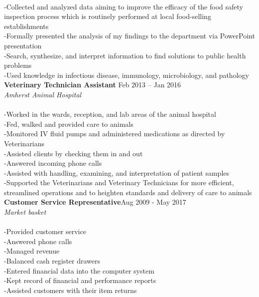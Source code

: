 \documentclass[11pt]{article}
\begin{document}
{{        \\-Collected and analyzed data aiming to improve the efficacy of the food safety inspection process which is routinely performed at local food-selling establishments 
        \\-Formally presented the analysis of my findings to the department via PowerPoint presentation
        \\-Search, synthesize, and interpret information to find solutions to public health problems
        \\-Used knowledge in infectious disease, immunology, microbiology, and pathology\\
        } \vspace{14pt}		
		\textsf{\textbf{Veterinary Technician Assistant }\hspace{245pt}Feb 2013 – Jan 2016 \\ \textit{Amherst Animal Hospital}\\
		 \\-Worked in the wards, reception, and lab areas of the animal hospital
        \\-Fed, walked and provided care to animals
        \\-Monitored IV fluid pumps and administered medications as directed by Veterinarians
        \\-Assisted clients by checking them in and out
        \\-Answered incoming phone calls
        \\-Assisted with handling, examining, and interpretation of patient samples
        \\-Supported the Veterinarians and Veterinary Technicians for more efficient, streamlined operations and to heighten standards and delivery of care to animals\\
        } \vspace{10pt}			
		\textsf{\textbf{Customer Service Representative}\hspace{240pt}Aug 2009 - May 2017 \\ \textit{Market basket}\\
		\\-Provided customer service
        \\-Answered phone calls 
        \\-Managed revenue
        \\-Balanced cash register drawers
        \\-Entered financial data into the computer system
        \\-Kept record of financial and performance reports
        \\-Assisted customers with their item returns
        }	
	}
	
\end{document}
